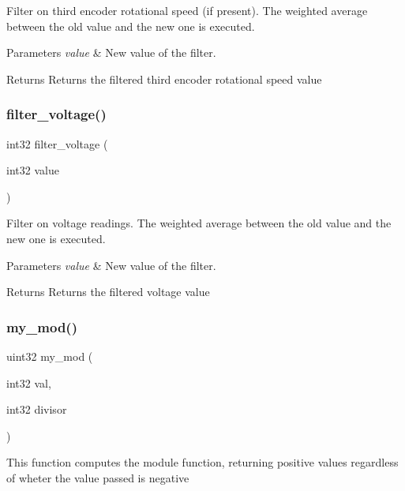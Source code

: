 Filter on third encoder rotational speed (if present). The weighted average between the old value and the new one is executed.


\begin{DoxyParams}{Parameters}
{\em value} & New value of the filter.\\
\hline
\end{DoxyParams}
\begin{DoxyReturn}{Returns}
Returns the filtered third encoder rotational speed value 
\end{DoxyReturn}
\mbox{\label{utils_8h_a31121e24e34f0c17ecd9d048577dd710}} 
\subsubsection{filter\+\_\+voltage()}
{\footnotesize\ttfamily int32 filter\+\_\+voltage (\begin{DoxyParamCaption}\item[{int32}]{value }\end{DoxyParamCaption})}

Filter on voltage readings. The weighted average between the old value and the new one is executed.


\begin{DoxyParams}{Parameters}
{\em value} & New value of the filter.\\
\hline
\end{DoxyParams}
\begin{DoxyReturn}{Returns}
Returns the filtered voltage value 
\end{DoxyReturn}
\mbox{\label{utils_8h_a01d3bb6c1fd469a6c530fb296e4fe0fe}} 
\subsubsection{my\+\_\+mod()}
{\footnotesize\ttfamily uint32 my\+\_\+mod (\begin{DoxyParamCaption}\item[{int32}]{val,  }\item[{int32}]{divisor }\end{DoxyParamCaption})}

This function computes the module function, returning positive values regardless of wheter the value passed is negative


